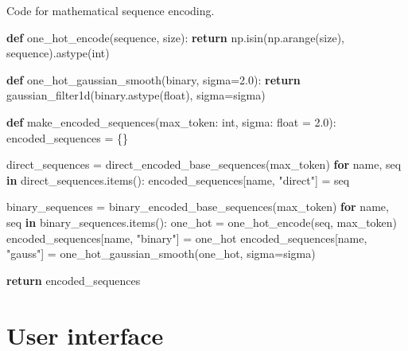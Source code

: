 \documentclass[
  a4paper, twoside, 10pt, titlepage]{book}
\newenvironment{Shaded}{}{}
\newcommand{\BuiltInTok}[1]{\textcolor[rgb]{0.00,0.50,0.00}{#1}}
\newcommand{\ControlFlowTok}[1]{\textcolor[rgb]{0.00,0.44,0.13}{\textbf{#1}}}
\newcommand{\FloatTok}[1]{\textcolor[rgb]{0.25,0.63,0.44}{#1}}
\newcommand{\KeywordTok}[1]{\textcolor[rgb]{0.00,0.44,0.13}{\textbf{#1}}}
\newcommand{\NormalTok}[1]{#1}
\newcommand{\OperatorTok}[1]{\textcolor[rgb]{0.40,0.40,0.40}{#1}}
\newcommand{\StringTok}[1]{\textcolor[rgb]{0.25,0.44,0.63}{#1}}
\begin{document}
\begin{codelisting}

\caption{Code for mathematical sequence
encoding.}\label{lst:mathencoding}

\begin{Shaded}
\begin{Highlighting}[]
\KeywordTok{def}\NormalTok{ one\_hot\_encode(sequence, size):}
    \ControlFlowTok{return}\NormalTok{ np.isin(np.arange(size), sequence).astype(}\BuiltInTok{int}\NormalTok{)}

\KeywordTok{def}\NormalTok{ one\_hot\_gaussian\_smooth(binary, sigma}\OperatorTok{=}\FloatTok{2.0}\NormalTok{):}
    \ControlFlowTok{return}\NormalTok{ gaussian\_filter1d(binary.astype(}\BuiltInTok{float}\NormalTok{), sigma}\OperatorTok{=}\NormalTok{sigma)}

\KeywordTok{def}\NormalTok{ make\_encoded\_sequences(max\_token: }\BuiltInTok{int}\NormalTok{, sigma: }\BuiltInTok{float} \OperatorTok{=} \FloatTok{2.0}\NormalTok{):}
\NormalTok{    encoded\_sequences }\OperatorTok{=}\NormalTok{ \{\}}

\NormalTok{    direct\_sequences }\OperatorTok{=}\NormalTok{ direct\_encoded\_base\_sequences(max\_token)}
    \ControlFlowTok{for}\NormalTok{ name, seq }\KeywordTok{in}\NormalTok{ direct\_sequences.items():}
\NormalTok{        encoded\_sequences[name, }\StringTok{"direct"}\NormalTok{] }\OperatorTok{=}\NormalTok{ seq}

\NormalTok{    binary\_sequences }\OperatorTok{=}\NormalTok{ binary\_encoded\_base\_sequences(max\_token)}
    \ControlFlowTok{for}\NormalTok{ name, seq }\KeywordTok{in}\NormalTok{ binary\_sequences.items():}
\NormalTok{        one\_hot }\OperatorTok{=}\NormalTok{ one\_hot\_encode(seq, max\_token)}
\NormalTok{        encoded\_sequences[name, }\StringTok{"binary"}\NormalTok{] }\OperatorTok{=}\NormalTok{ one\_hot}
\NormalTok{        encoded\_sequences[name, }\StringTok{"gauss"}\NormalTok{] }\OperatorTok{=}\NormalTok{ one\_hot\_gaussian\_smooth(one\_hot, sigma}\OperatorTok{=}\NormalTok{sigma)}

    \ControlFlowTok{return}\NormalTok{ encoded\_sequences}
\end{Highlighting}
\end{Shaded}

\end{codelisting}

\section{User interface}\label{user-interface}
\end{document}
